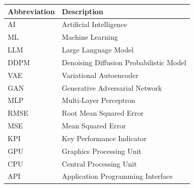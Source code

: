 \large
\begin{center}
  \renewcommand{\arraystretch}{1.5} %
  \begin{tabular}{|p{4cm}|p{10cm}|}  %
    \hline %
    \textbf{Abbreviation} & \textbf{Description} \\
    \hline %
    AI & Artificial Intelligence \\
    \hline %
    ML & Machine Learning \\
    \hline %
    LLM & Large Language Model \\
    \hline %
    DDPM & Denoising Diffusion Probabilistic Model \\
    \hline %
    VAE & Variational Autoencoder \\
    \hline %
    GAN & Generative Adversarial Network \\
    \hline %
    MLP & Multi-Layer Perceptron \\
    \hline %
    RMSE & Root Mean Squared Error \\
    \hline %
    MSE & Mean Squared Error \\
    \hline %
    KPI & Key Performance Indicator \\
    \hline %
    GPU & Graphics Processing Unit \\
    \hline %
    CPU & Central Processing Unit \\
    \hline %
    API & Application Programming Interface \\
    \hline %
  \end{tabular}
\end{center}
